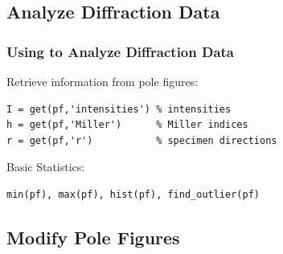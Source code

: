\subsection*{Analyze Diffraction Data}

\begin{frame}[fragile]
  \frametitle{Using \MTEX to Analyze Diffraction Data}



Retrieve information from pole figures:
\begin{lstlisting}
I = get(pf,'intensities') % intensities
h = get(pf,'Miller')      % Miller indices
r = get(pf,'r')           % specimen directions
\end{lstlisting}

Basic Statistics:
\begin{lstlisting}
min(pf), max(pf), hist(pf), find_outlier(pf)
\end{lstlisting}


\end{frame}

\subsection*{Modify Pole Figures}

